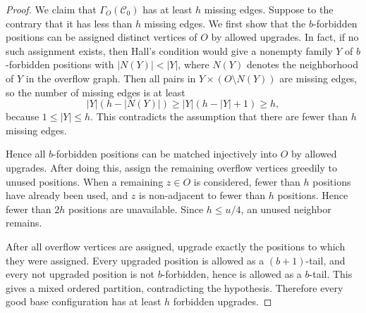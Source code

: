 \documentclass[10pt,a4paper]{article}
\numberwithin{equation}{section}
\theoremstyle{definition}
\begin{document}
\begin{proof}
        We claim that $\Gamma_O(\mathcal C_0)$ has at least $h$ missing edges.
        Suppose to the contrary that it has less than $h$ missing edges.
        We first show that the $b$-forbidden positions can be assigned distinct vertices of $O$ by allowed upgrades.
        In fact, if no such assignment exists, then Hall's condition would give a nonempty family $Y$ of $b$-forbidden positions with $|N(Y)|<|Y|$, where $N(Y)$ denotes the neighborhood of $Y$ in the overflow graph.
        Then all pairs in $Y\times (O\setminus N(Y))$ are missing edges, so the number of missing edges is at least
        \[
                |Y|(h-|N(Y)|)
                \ge |Y|(h-|Y|+1)
                \ge h,
        \]
        because $1\le |Y|\le h$.
        This contradicts the assumption that there are fewer than $h$ missing edges.

        Hence all $b$-forbidden positions can be matched injectively into $O$ by allowed upgrades.
        After doing this, assign the remaining overflow vertices greedily to unused positions.
        When a remaining $z\in O$ is considered, fewer than $h$ positions have already been used, and $z$ is non-adjacent to fewer than $h$ positions.
        Hence fewer than $2h$ positions are unavailable.
        Since $h\le u/4$, an unused neighbor remains.

        After all overflow vertices are assigned, upgrade exactly the positions to which they were assigned.
        Every upgraded position is allowed as a $(b+1)$-tail, and every not upgraded position is not $b$-forbidden, hence is allowed as a $b$-tail.
        This gives a mixed ordered partition, contradicting the hypothesis.
        Therefore every good base configuration has at least $h$ forbidden upgrades.


\end{proof}
\end{document}

